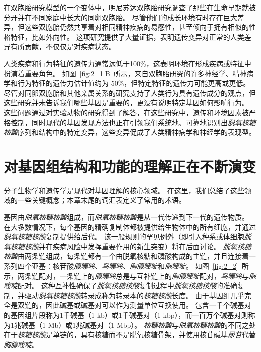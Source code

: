 在双胞胎研究模型的一个变体中，明尼苏达双胞胎研究调查了那些在生命早期就被分开并在不同家庭中长大的同卵双胞胎。
尽管他们的成长环境有时存在巨大差异，但这些双胞胎仍然共享着对相同精神疾病的易感性，甚至倾向于拥有相似的性格特征，比如外向性。
这项研究提供了大量证据，表明遗传变异对正常的人类差异有所贡献，不仅仅是对疾病状态。





人类疾病和行为特征的遗传力通常远低于100\%，这表明环境在形成疾病或特征中扮演着重要角色。
如图~\ref{fig:2_1}B~所示，来自双胞胎研究的许多神经学、精神病学和行为特征的遗传力估计值约为 50\%，但特定特征的遗传力可能更高或更低。
尽管对同卵双胞胎和其他亲属关系的研究支持了人类行为具有遗传成分的观点，但这些研究并未告诉我们哪些基因是重要的，更没有说明特定基因如何影响行为。
这些问题通过对实验动物的研究得到了解答，在这些研究中，遗传和环境因素被严格控制，同时现代的基因发现方法也正在引领我们系统地、可靠地识别出\textit{脱氧核糖核酸}序列和结构中的特定变异，这些变异促成了人类精神病学和神经学的表现型。



\section{对基因组结构和功能的理解正在不断演变}

分子生物学和遗传学是现代对基因理解的核心领域。
在这里，我们总结了这些领域的一些关键概念；本章末尾的词汇表定义了常用的术语。




基因由\textit{脱氧核糖核酸}组成，而\textit{脱氧核糖核酸}是从一代传递到下一代的遗传物质。
在大多数情况下，每个基因的精确复制体都被提供给生物体中的所有细胞，并通过\textit{脱氧核糖核酸}复制提供给后代。
该一般规则的罕见例外（即引入种系或体细胞\textit{脱氧核糖核酸}并在疾病风险中发挥重要作用的新生突变）将在后面讨论。
\textit{脱氧核糖核酸}由两条链组成，每条链都有一个由脱氧核糖和磷酸构成的主链，并且连接着一系列四个亚基：核苷酸\textit{腺嘌呤}、\textit{鸟嘌呤}、\textit{胸腺嘧啶}和\textit{胞嘧啶}。
如图~\ref{fig:2_2}~所示，两条链配对，一条链上的\textit{腺嘌呤}总是与互补链上的\textit{胸腺嘧啶}配对，\textit{鸟嘌呤}与\textit{胞嘧啶}配对。
这种互补性确保了\textit{脱氧核糖核酸}复制过程中\textit{脱氧核糖核酸}的准确复制，并驱动\textit{脱氧核糖核酸}转录成称为转录本的\textit{核糖核酸}长度。
由于基因组几乎完全是双链的，因此碱基或碱基对可以作为测量单位互换使用。
包含一千个碱基对的基因组片段称为1千碱基（1 kb）或1千碱基对（1 kbp），而一百万个碱基对则称为1兆碱基（1 Mb）或1兆碱基对（1 Mbp）。
\textit{核糖核酸}与\textit{脱氧核糖核酸}的不同之处在于\textit{核糖核酸}是单链的，具有核糖而不是脱氧核糖骨架，并使用核苷碱基\textit{尿苷}代替\textit{胸腺嘧啶}。


